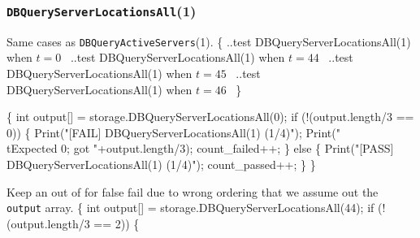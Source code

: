 \documentclass{article}
\def\nwendcode{\endtrivlist \endgroup}
\let\nwdocspar=\par
\begin{document}
\subsubsection{{\tt{}DBQueryServerLocationsAll}(1)}
Same cases as {\tt{}DBQueryActiveServers}(1).
\nwenddocs{}\endmoddef{}
\{
  \LA{}..test \code{}DBQueryServerLocationsAll\edoc{}(1) when $t=0$~{\nwtagstyle{}}\RA{}
  \LA{}..test \code{}DBQueryServerLocationsAll\edoc{}(1) when $t=44$~{\nwtagstyle{}}\RA{}
  \LA{}..test \code{}DBQueryServerLocationsAll\edoc{}(1) when $t=45$~{\nwtagstyle{}}\RA{}
  \LA{}..test \code{}DBQueryServerLocationsAll\edoc{}(1) when $t=46$~{\nwtagstyle{}}\RA{}
\}
\nwendcode{}\nwdocspar
\nwenddocs{}\endmoddef{}
\{
  int output[] = storage.DBQueryServerLocationsAll(0);
  if (!(output.length/3 == 0)) \{
    Print("[FAIL] DBQueryServerLocationsAll(1) (1/4)");
    Print("\\tExpected 0; got "+output.length/3);
    count_failed++;
  \} else \{
    Print("[PASS] DBQueryServerLocationsAll(1) (1/4)");
    count_passed++;
  \}
\}
\nwendcode{}\nwdocspar
Keep an out of for false fail due to wrong ordering that we assume out
the {\tt{}output} array.
\nwenddocs{}\endmoddef{}
\{
  int output[] = storage.DBQueryServerLocationsAll(44);
  if (!(output.length/3 == 2)) \{
\end{document}
